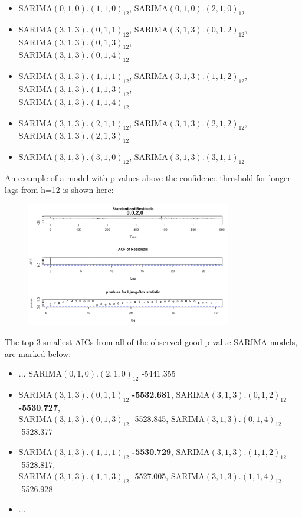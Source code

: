 \documentclass[a4paper,11pt]{article}
\begin{document}
    \begin{itemize}
        \item $\text{SARIMA}(0,1,0).(1,1,0)_{12}$, $\text{SARIMA}(0,1,0).(2,1,0)_{12}$
        \item $\text{SARIMA}(3,1,3).(0,1,1)_{12}$, $\text{SARIMA}(3,1,3).(0,1,2)_{12}$, $\text{SARIMA}(3,1,3).(0,1,3)_{12}$, \\ $\text{SARIMA}(3,1,3).(0,1,4)_{12}$
        \item $\text{SARIMA}(3,1,3).(1,1,1)_{12}$, $\text{SARIMA}(3,1,3).(1,1,2)_{12}$, $\text{SARIMA}(3,1,3).(1,1,3)_{12}$, \\ $\text{SARIMA}(3,1,3).(1,1,4)_{12}$
        \item $\text{SARIMA}(3,1,3).(2,1,1)_{12}$, $\text{SARIMA}(3,1,3).(2,1,2)_{12}$, $\text{SARIMA}(3,1,3).(2,1,3)_{12}$
        \item $\text{SARIMA}(3,1,3).(3,1,0)_{12}$, $\text{SARIMA}(3,1,3).(3,1,1)_{12}$
    \end{itemize}

    An example of a model with p-values above the confidence threshold for longer lags from h=12 is shown here:

    \begin{figure}[H]
        \centering
        \includegraphics[width=0.8\textwidth]{ha-1_files/figure-markdown_strict/0-0-2-0.png}
        \label{fig:f7}
    \end{figure}

    The top-3 smallest AICs from all of the observed good p-value SARIMA models, are marked below:

    \begin{itemize}
        \item ... $\text{SARIMA}(0,1,0).(2,1,0)_{12}$ -5441.355
        \item $\text{SARIMA}(3,1,3).(0,1,1)_{12}$ \textbf{-5532.681}, $\text{SARIMA}(3,1,3).(0,1,2)_{12}$ \textbf{-5530.727}, \\ $\text{SARIMA}(3,1,3).(0,1,3)_{12}$ -5528.845, $\text{SARIMA}(3,1,3).(0,1,4)_{12}$ -5528.377
        \item $\text{SARIMA}(3,1,3).(1,1,1)_{12}$ \textbf{-5530.729}, $\text{SARIMA}(3,1,3).(1,1,2)_{12}$ -5528.817, \\ $\text{SARIMA}(3,1,3).(1,1,3)_{12}$ -5527.005, $\text{SARIMA}(3,1,3).(1,1,4)_{12}$ -5526.928
        \item ...
    \end{itemize}
\end{document}
